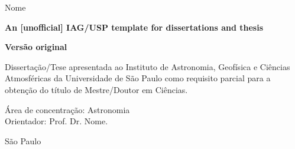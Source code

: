 

\thispagestyle{empty}%
\begin{center}
  Nome

  \vspace{3cm}

  \textbf{An [unofficial] IAG/USP template for dissertations and thesis}

  \vspace{3cm}

  \textbf{Versão original}

  \vspace{3cm}

  \begin{flushright}
    \begin{minipage}{.6\linewidth}
      Dissertação/Tese apresentada ao Instituto de Astronomia, \mbox{Geofísica} e Ciências Atmosféricas da Universidade de São Paulo como requisito parcial para a obtenção do título de Mestre/Doutor em \mbox{Ciências}.
      
      \vspace{0.5cm}
      
      Área de concentração: Astronomia
      \\
      Orientador: Prof. Dr. Nome.
    \end{minipage}
  \end{flushright}
  \vfill
  
  São Paulo\\
  \the\year\\

\end{center}

\newpage
\shipout\null %

\restoregeometry %